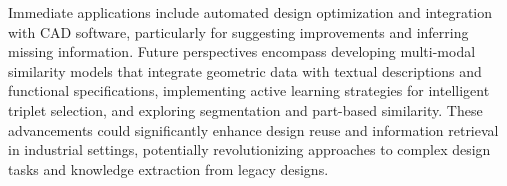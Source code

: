 \documentclass{article}
\begin{document}
Immediate applications include automated design optimization and integration with CAD software, particularly for suggesting improvements and inferring missing information. Future perspectives encompass developing multi-modal similarity models that integrate geometric data with textual descriptions and functional specifications, implementing active learning strategies for intelligent triplet selection, and exploring segmentation and part-based similarity. These advancements could significantly enhance design reuse and information retrieval in industrial settings, potentially revolutionizing approaches to complex design tasks and knowledge extraction from legacy designs.

\nocite{langley00}





\end{document}
